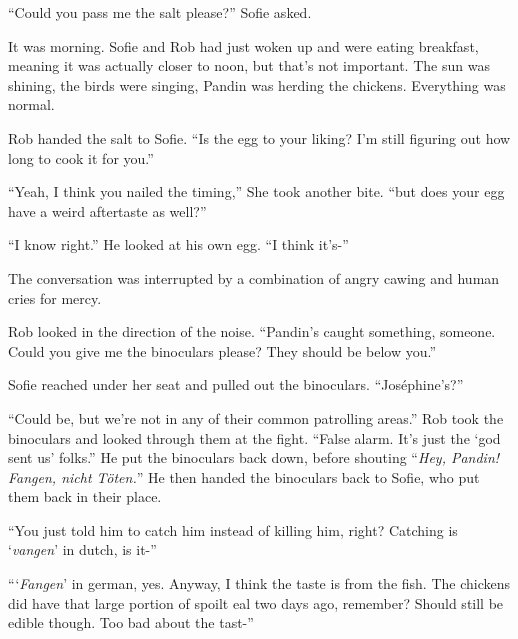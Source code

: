 \documentclass[letterpaper,12pt]{report}
\begin{document}
\def\columns#1#2{
\begin{minipage}[t]{.5\textwidth}
\raggedright
#1
\end{minipage}
\hfill
\begin{minipage}[t]{.5\textwidth}
\raggedright
#2
\end{minipage}
}

\def\act{~\\\line(1, 0){250}~\\}

\def\empty{\vspace{.3cm}\\}

\def\nonopenquotation{}

``Could you pass me the salt please?'' Sofie asked.

It was morning. Sofie and Rob had just woken up and were eating breakfast, meaning it was actually closer to noon, but that's not important. The sun was shining, the birds were singing, Pandin was herding the chickens. Everything was normal.

Rob handed the salt to Sofie. ``Is the egg to your liking? I'm still figuring out how long to cook it for you.''

``Yeah, I think you nailed the timing,'' She took another bite. ``but does your egg have a weird aftertaste as well?''

``I know right.'' He looked at his own egg. ``I think it's-''

The conversation was interrupted by a combination of angry cawing and human cries for mercy.

Rob looked in the direction of the noise. ``Pandin's caught something, someone. Could you give me the binoculars please? They should be below you.''

Sofie reached under her seat and pulled out the binoculars. ``Jos\'ephine's?''

``Could be, but we're not in any of their common patrolling areas.'' Rob took the binoculars and looked through them at the fight. ``False alarm. It's just the `god sent us' folks.'' He put the binoculars back down, before shouting ``\textit{Hey, Pandin! Fangen, nicht T\"oten.}'' He then handed the binoculars back to Sofie, who put them back in their place.

``You just told him to catch him instead of killing him, right? Catching is `\textit{vangen}' in dutch, is it-''

```\textit{Fangen}' in german, yes. Anyway, I think the taste is from the fish. The chickens did have that large portion of spoilt eal two days ago, remember? Should still be edible though. Too bad about the tast-''
\end{document}
